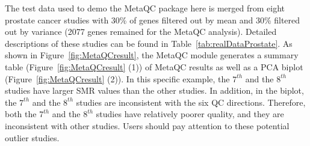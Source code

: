 The test data used to demo the MetaQC package here is merged from eight prostate cancer studies with 30\% of genes filtered out by mean and 30\% filtered out by variance (2077 genes remained for the MetaQC analysis). 
Detailed descriptions of these studies can be found in Table~\ref{tab:realDataProstate}. 
As shown in Figure~\ref{fig:MetaQCresult}, 
the MetaQC module generates a summary table (Figure~\ref{fig:MetaQCresult} {\color{red} (1)}) of MetaQC results 
as well as a PCA biplot (Figure~\ref{fig:MetaQCresult}  {\color{red} (2)}). 
In this specific example, the $7^{th}$ and the $8^{th}$ studies have larger SMR values than the other studies.
In addition, in the biplot,  the $7^{th}$ and the $8^{th}$ studies are inconsistent with the six QC directions.
Therefore, both the $7^{th}$ and the $8^{th}$ studies have relatively poorer quality, and they are inconsistent with other studies.
Users should pay attention to these potential outlier studies.


